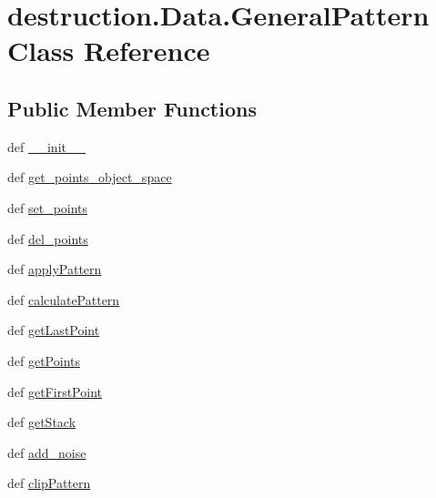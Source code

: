 \hypertarget{classdestruction_1_1_data_1_1_general_pattern}{\section{destruction.\-Data.\-General\-Pattern Class Reference}
\label{classdestruction_1_1_data_1_1_general_pattern}
}
\subsection*{Public Member Functions}
\begin{DoxyCompactItemize}
\item 
def \hyperlink{classdestruction_1_1_data_1_1_general_pattern_a2d5fc8c70f18fc378464a5ed9b81c8a2}{\-\_\-\-\_\-init\-\_\-\-\_\-}
\item 
def \hyperlink{classdestruction_1_1_data_1_1_general_pattern_af91581a5ddac0f3f424d6229a643ab72}{get\-\_\-points\-\_\-object\-\_\-space}
\item 
def \hyperlink{classdestruction_1_1_data_1_1_general_pattern_acf4e50f2df71858e3fafd9adf18efeeb}{set\-\_\-points}
\item 
def \hyperlink{classdestruction_1_1_data_1_1_general_pattern_a3846e2954c5c70737a515cd851cb1b32}{del\-\_\-points}
\item 
def \hyperlink{classdestruction_1_1_data_1_1_general_pattern_a3e6bab92a77de393ecc7d46f8f065760}{apply\-Pattern}
\item 
def \hyperlink{classdestruction_1_1_data_1_1_general_pattern_adfed256c575b9d4bf4258fce8b0da995}{calculate\-Pattern}
\item 
def \hyperlink{classdestruction_1_1_data_1_1_general_pattern_a2589cbbdd616735dcaaeabd64dd0ed5b}{get\-Last\-Point}
\item 
def \hyperlink{classdestruction_1_1_data_1_1_general_pattern_a095d49c06bc9d78950c75b89fc33c447}{get\-Points}
\item 
def \hyperlink{classdestruction_1_1_data_1_1_general_pattern_aade35e3fb5a5f29dba6b3b1857d5615b}{get\-First\-Point}
\item 
def \hyperlink{classdestruction_1_1_data_1_1_general_pattern_a1943b74944ee2628b09cf0579b0d4d0e}{get\-Stack}
\item 
def \hyperlink{classdestruction_1_1_data_1_1_general_pattern_a7910298bb7152fbc32cf69bf315e6c6b}{add\-\_\-noise}
\item 
def \hyperlink{classdestruction_1_1_data_1_1_general_pattern_a7c3715ec3f57346fa18f0c72358614df}{clip\-Pattern}
\end{DoxyCompactItemize}
